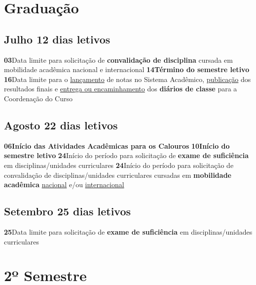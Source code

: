\documentclass[thesis]{hmcposter}
\begin{document}
\begin{poster}
\section{\color{hmcorange}Graduação}\subsection{Julho \hfill 12 dias letivos}\textbf{03}\qquad Data limite para solicitação de \textbf{convalidação de disciplina} cursada em mobilidade acadêmica nacional e internacional \newline \null\textbf{14}\qquad \textbf{Término do semestre letivo} \newline \null\textbf{16}\qquad Data limite para o \underline{lançamento} de notas no Sistema Acadêmico, \underline{publicação} dos resultados finais e \underline{entrega ou encaminhamento} dos \textbf{diários de classe} para a Coordenação do Curso \newline \null\subsection{Agosto \hfill 22 dias letivos}\textbf{06}\qquad \textbf{Início das Atividades Acadêmicas para os Calouros} \newline \null\textbf{10}\qquad \textbf{Início do semestre letivo} \newline \null\textbf{24}\qquad Início do período para solicitação de \textbf{exame de suficiência} em disciplinas/unidades curriculares \newline \null\textbf{24}\qquad Início do período para solicitação de convalidação de disciplinas/unidades curriculares cursadas em \textbf{mobilidade acadêmica} \underline{nacional} e/ou \underline{internacional} \newline \null\subsection{Setembro \hfill 25 dias letivos}\textbf{25}\qquad Data limite para solicitação de \textbf{exame de suficiência} em disciplinas/unidades curriculares \newline \null\vfill\null
\columnbreak
\section{\hfill \color{hmcorange}2º Semestre}

\end{poster}
\end{document}
